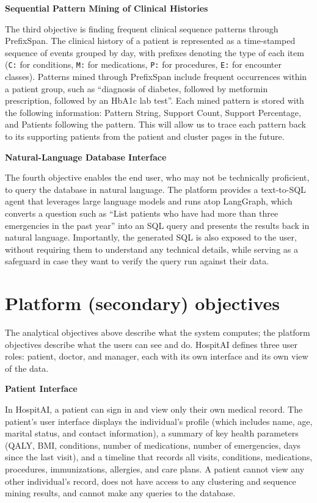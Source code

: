 \vspace{0.5em}
\noindent\textbf{Sequential Pattern Mining of Clinical Histories}

The third objective is finding frequent clinical sequence patterns through PrefixSpan. The clinical history of a patient is represented as a time-stamped sequence of events grouped by day, with prefixes denoting the type of each item (\texttt{C:} for conditions, \texttt{M:} for medications, \texttt{P:} for procedures, \texttt{E:} for encounter classes). Patterns mined through PrefixSpan include frequent occurrences within a patient group, such as “diagnosis of diabetes, followed by metformin prescription, followed by an HbA1c lab test”. Each mined pattern is stored with the following information: Pattern String, Support Count, Support Percentage, and Patients following the pattern. This will allow us to trace each pattern back to its supporting patients from the patient and cluster pages in the future.

\vspace{0.5em}
\noindent\textbf{Natural-Language Database Interface}

The fourth objective enables the end user, who may not be technically proficient, to query the database in natural language. The platform provides a text-to-SQL agent that leverages large language models and runs atop LangGraph, which converts a question such as “List patients who have had more than three emergencies in the past year” into an SQL query and presents the results back in natural language. Importantly, the generated SQL is also exposed to the user, without requiring them to understand any technical details, while serving as a safeguard in case they want to verify the query run against their data.

\section{Platform (secondary) objectives}

The analytical objectives above describe what the system computes; the platform objectives describe what the users can see and do. HospitAI defines three user roles: patient, doctor, and manager, each with its own interface and its own view of the data.

\vspace{0.5em}
\noindent\textbf{Patient Interface}

In HospitAI, a patient can sign in and view only their own medical record. The patient's user interface displays the individual’s profile (which includes name, age, marital status, and contact information), a summary of key health parameters (QALY, BMI, conditions, number of medications, number of emergencies, days since the last visit), and a timeline that records all visits, conditions, medications, procedures, immunizations, allergies, and care plans. A patient cannot view any other individual's record, does not have access to any clustering and sequence mining results, and cannot make any queries to the database.

